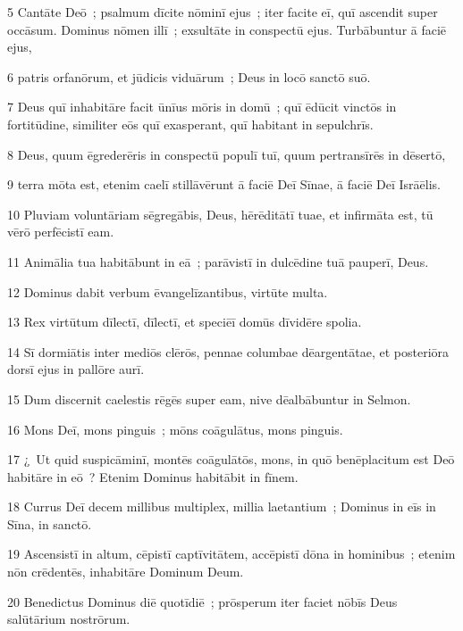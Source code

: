 \psalmVerse
  {\phantom{00}5}
  {Cantāte Deō~; psalmum dīcite nōminī ejus~; iter facite eī, quī ascendit super occāsum. Dominus nōmen illī~; exsultāte in conspectū ejus. Turbābuntur ā faciē ejus,}


\psalmVerse
  {\phantom{00}6}
  {patris orfanōrum, et jūdicis viduārum~; Deus in locō sanctō suō.}


\psalmVerse
  {\phantom{00}7}
  {Deus quī inhabitāre facit ūnīus mōris in domū~; quī ēdūcit vinctōs in fortitūdine, similiter eōs quī exasperant, quī habitant in sepulchrīs.}


\psalmVerse
  {\phantom{00}8}
  {Deus, quum ēgrederēris in conspectū populī tuī, quum pertransīrēs in dēsertō,}


\psalmVerse
  {\phantom{00}9}
  {terra mōta est, etenim caelī stillāvērunt ā faciē Deī Sīnae, ā faciē Deī Isrāēlis.}


\psalmVerse
  {\phantom{0}10}
  {Pluviam voluntāriam sēgregābis, Deus, hērēditātī tuae, et infirmāta est, tū vērō perfēcistī eam.}


\psalmVerse
  {\phantom{0}11}
  {Animālia tua habitābunt in eā~; parāvistī in dulcēdine tuā pauperī, Deus.}


\psalmVerse
  {\phantom{0}12}
  {Dominus dabit verbum ēvangelīzantibus, virtūte multa.}


\psalmVerse
  {\phantom{0}13}
  {Rex virtūtum dīlectī, dīlectī, et speciēī domūs dīvidēre spolia.}


\psalmVerse
  {\phantom{0}14}
  {Sī dormiātis inter mediōs clērōs, pennae columbae dēargentātae, et posteriōra dorsī ejus in pallōre aurī.}


\psalmVerse
  {\phantom{0}15}
  {Dum discernit caelestis rēgēs super eam, nive dēalbābuntur in Selmon.}


\psalmVerse
  {\phantom{0}16}
  {Mons Deī, mons pinguis~; mōns coāgulātus, mons pinguis.}


\psalmVerse
  {\phantom{0}17}
  {¿~Ut quid suspicāminī, montēs coāgulātōs, mons, in quō benēplacitum est Deō habitāre in eō~? Etenim Dominus habitābit in fīnem.}


\psalmVerse
  {\phantom{0}18}
  {Currus Deī decem millibus multiplex, millia laetantium~; Dominus in eīs in Sīna, in sanctō.}


\psalmVerse
  {\phantom{0}19}
  {Ascensistī in altum, cēpistī captīvitātem, accēpistī dōna in hominibus~; etenim nōn crēdentēs, inhabitāre Dominum Deum.}


\psalmVerse
  {\phantom{0}20}
  {Benedictus Dominus diē quotīdiē~; prōsperum iter faciet nōbīs Deus salūtārium nostrōrum.}


